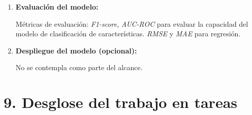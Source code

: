 \documentclass[
11pt, %
]{charter}
\begin{document}
\begin{enumerate}
  \item \textbf{Evaluación del modelo:}

  Métricas de evaluación: \textit{F1-score}, \textit{AUC-ROC} para evaluar la capacidad del modelo de clasificación de características. \textit{RMSE} y \textit{MAE} para regresión.

  \item \textbf{Despliegue del modelo (opcional):} 
  
  No se contempla como parte del alcance.
\end{enumerate}

\section{9. Desglose del trabajo en tareas}
\label{sec:wbs}


\end{document}
